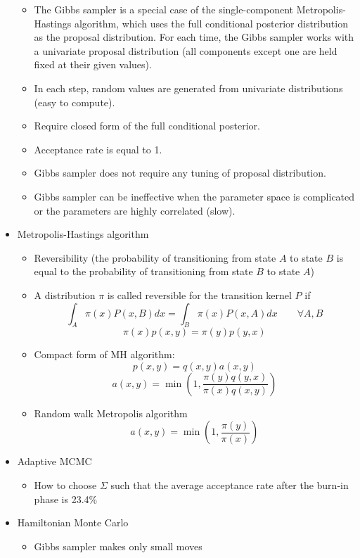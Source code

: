 \documentclass[a4paper]{article}
\begin{document}
\begin{itemize}
\begin{itemize}
        \item The Gibbs sampler is a special case of the single-component Metropolis-Hastings algorithm, which uses the full conditional posterior distribution as the proposal distribution. For each time, the Gibbs sampler works with a univariate proposal distribution (all components except one are held fixed at their given values).
        \item In each step, random values are generated from univariate distributions (easy to compute).
        \item Require closed form of the full conditional posterior.
        \item Acceptance rate is equal to 1.
        \item Gibbs sampler does not require any tuning of proposal distribution.
        \item Gibbs sampler can be ineffective when the parameter space is complicated or the parameters are highly correlated (slow).
    \end{itemize}
    \item Metropolis-Hastings algorithm
    \begin{itemize}
        \item Reversibility (the probability of transitioning from state $A$ to state $B$ is equal to the probability of transitioning from state $B$ to state $A$)
        \item A distribution $\pi$ is called reversible for the transition kernel $P$ if
        \[\int_A\pi(x)P(x, B)dx=\int_B\pi(x)P(x,A)dx \qquad\forall A, B \]
        \[\pi(x)p(x,y)=\pi(y)p(y,x) \]
        \item Compact form of MH algorithm:
        \[p(x,y)=q(x,y)a(x,y) \]
        \[a(x,y)=\min\left(1,\frac{\pi(y)q(y,x)}{\pi(x)q(x,y)} \right) \]
        \item Random walk Metropolis algorithm
        \[a(x,y)=\min\left(1,\frac{\pi(y)}{\pi(x)} \right) \]
    \end{itemize}
    \item Adaptive MCMC
    \begin{itemize}
        \item How to choose $\Sigma$ such that the average acceptance rate after the burn-in phase is 23.4\%
    \end{itemize}
    \item Hamiltonian Monte Carlo
    \begin{itemize}
        \item Gibbs sampler makes only small moves

\end{itemize}
\end{itemize}
\end{document}
